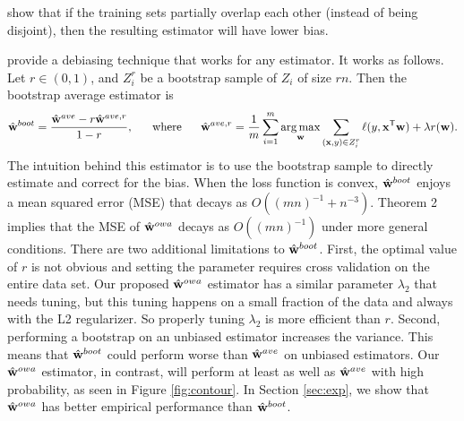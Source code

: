 \documentclass[thesis.tex]{subfiles}
\begin{document}
\citet{zinkevich2010parallelized} show that if the training sets partially overlap each other (instead of being disjoint), then the resulting estimator will have lower bias.

\citet{zhang2012communication} provide a debiasing technique that works for any estimator.
It works as follows.
Let $r\in(0,1)$, and $Z_i^r$ be a bootstrap sample of $Z_i$ of size $rn$.
Then the bootstrap average estimator is
\begin{equation*}
\hat{\mathbf w}^{boot} = \frac{\hat{\mathbf w}^{ave}-r\hat{\mathbf w}^{ave,r}}{1-r},
\text{~~~~~where~~~~~}
\hat{\mathbf w}^{ave,r} = \frac{1}{m}\sum_{i=1}^m \operatorname*{arg\,max}_\mathbf w \sum_{(\mathbf{x},y)\in Z_i^r} \ell(y,{\mathbf{x}}^{\mathsf{T}}\mathbf w) + \lambda r(\mathbf w)
.
\end{equation*}
The intuition behind this estimator is to use the bootstrap sample to directly estimate and correct for the bias.
When the loss function is convex, $\hat{\mathbf w}^{boot}$ enjoys a mean squared error (MSE) that decays as $O((mn)^{-1}+n^{-3})$. %
Theorem 2 implies that the MSE of $\hat{\mathbf w}^{owa}$ decays as $O((mn)^{-1})$ under more general conditions.
There are two additional limitations to $\hat{\mathbf w}^{boot}$.
First, the optimal value of $r$ is not obvious and setting the parameter requires cross validation on the entire data set.
Our proposed $\hat{\mathbf w}^{owa}$ estimator has a similar parameter $\lambda_2$ that needs tuning,
but this tuning happens on a small fraction of the data and always with the L2 regularizer.
So properly tuning $\lambda_2$ is more efficient than $r$.
Second, performing a bootstrap on an unbiased estimator increases the variance.
This means that $\hat{\mathbf w}^{boot}$ could perform worse than $\hat{\mathbf w}^{ave}$ on unbiased estimators.
Our $\hat{\mathbf w}^{owa}$ estimator, in contrast, will perform at least as well as $\hat{\mathbf w}^{ave}$ with high probability, as seen in Figure \ref{fig:contour}.
In Section \ref{sec:exp}, we show that $\hat{\mathbf w}^{owa}$ has better empirical performance than $\hat{\mathbf w}^{boot}$.
\end{document}
